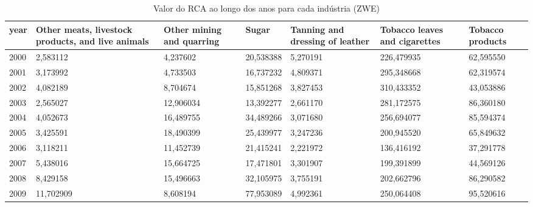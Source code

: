 \begin{table}
\centering
\caption{Valor do RCA ao longo dos anos para cada indústria (ZWE)}
\begin{tabular}{p{1cm}p{2cm}p{2cm}p{2cm}p{2cm}p{2cm}p{2cm}}
\toprule
 year &  Other meats, livestock products, and live animals &  Other mining and quarring &     Sugar &  Tanning and dressing of leather &  Tobacco leaves and cigarettes &  Tobacco products \\
\midrule
 2000 &                                           2,583112 &                   4,237602 & 20,538388 &                         5,270191 &                     226,479935 &         62,595550 \\
 2001 &                                           3,173992 &                   4,733503 & 16,737232 &                         4,809371 &                     295,348668 &         62,319574 \\
 2002 &                                           4,082189 &                   8,704674 & 15,851268 &                         3,827453 &                     310,433352 &         43,053886 \\
 2003 &                                           2,565027 &                  12,906034 & 13,392277 &                         2,661170 &                     281,172575 &         86,360180 \\
 2004 &                                           4,052673 &                  16,489755 & 34,489266 &                         3,071680 &                     256,694077 &         85,594374 \\
 2005 &                                           3,425591 &                  18,490399 & 25,439977 &                         3,247236 &                     200,945520 &         65,849632 \\
 2006 &                                           3,118211 &                  11,452739 & 21,415241 &                         2,221972 &                     136,416192 &         37,291778 \\
 2007 &                                           5,438016 &                  15,664725 & 17,471801 &                         3,301907 &                     199,391899 &         44,569126 \\
 2008 &                                           8,429158 &                  15,496663 & 32,105975 &                         3,755191 &                     202,662796 &         86,290582 \\
 2009 &                                          11,702909 &                   8,608194 & 77,953089 &                         4,992361 &                     250,064408 &         95,520616 \\

\end{tabular}
\end{table}
